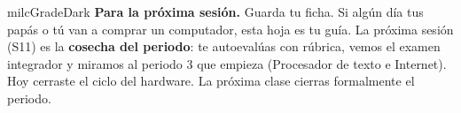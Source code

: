 \documentclass[11pt,letterpaper]{article}
\begin{document}
\begin{infoband}{milcGradeDark}
\textbf{Para la próxima sesión.} Guarda tu ficha. Si algún día tus papás o tú van a comprar un computador, esta hoja es tu guía. La próxima sesión (S11) es la \textbf{cosecha del periodo}: te autoevalúas con rúbrica, vemos el examen integrador y miramos al periodo 3 que empieza (Procesador de texto e Internet). Hoy cerraste el ciclo del hardware. La próxima clase cierras formalmente el periodo.
\end{infoband}
\end{document}
